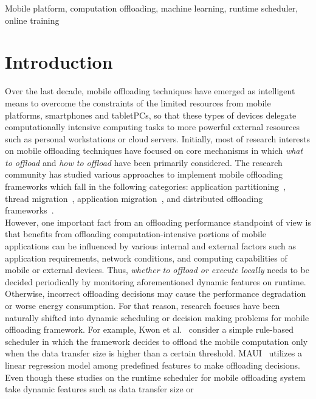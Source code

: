 \documentclass[10pt, conference, compsocconf]{IEEEtran}
\begin{document}
\begin{IEEEkeywords}
Mobile platform, computation offloading, machine learning, runtime
scheduler, online training
\end{IEEEkeywords}

\section{Introduction}
%
Over the last decade, mobile offloading techniques have emerged as
intelligent means to overcome the constraints of the limited resources
from mobile platforms, smartphones and tabletPCs, so that these types of
devices delegate computationally intensive computing tasks to more
powerful external resources such as personal workstations or cloud
servers.
%
Initially, most of research interests on mobile offloading techniques
have focused on core mechanisms in which \textit{what to offload} and
\textit{how to offload} have been primarily considered. 
%
The research community has studied various approaches to implement mobile
offloading frameworks which fall in the following categories:
application partitioning~\cite{spectra, maui, cuckoo}, thread
migration~\cite{clonecloud, comet}, application migration~\cite{hung},
and distributed offloading frameworks~\cite{mmr, sonora, serendipity}.\\
%
\indent However, one important fact from an offloading performance
standpoint of view is that benefits from offloading
computation-intensive portions of mobile applications can be influenced
by various internal and external factors such as application
requirements, network conditions, and computing capabilities of mobile
or external devices.
%
Thus, \textit{whether to offload or execute locally} needs to be
decided periodically by monitoring aforementioned dynamic features on
runtime.
%
Otherwise, incorrect offloading decisions may cause the performance
degradation or worse energy consumption.
%
For that reason, research focuses have been naturally shifted into
dynamic scheduling or decision making problems for mobile offloading
framework.
%
For example, Kwon et al.~\cite{kwon} consider a simple rule-based
scheduler in which the framework decides to offload the mobile
computation only when the data transfer size is higher than a certain
threshold.
%
MAUI~\cite{maui} utilizes a linear regression model among predefined
features to make offloading decisions.\\
%
\indent Even though these studies on the runtime scheduler for mobile
offloading system take dynamic features such as data transfer size or
\end{document}
